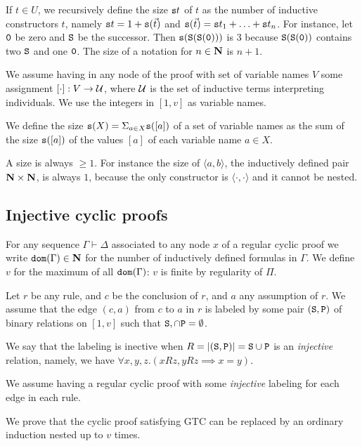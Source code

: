 \documentclass{lmcs}
\begin{document}
If $t \in U$, we recursively define the size ${\tt s}{t}$ of $t$ as the number of inductive 
constructors $t$, namely ${\tt s}{t} = 1 + {\tt s}(\vec{t})$ and 
${\tt s}(\vec{t}) = {\tt s}{t_1} + \ldots + {\tt s}{t_n}$. 
For instance, let $\tt 0$ be zero and $\tt S$ be the successor. 
Then $\tt {\tt s}(S(S(0)))$ is $3$
because $\tt S(S(0))$ contains two $\tt S$ and one $\tt 0$. 
The size of a notation for $n \in {\bf N}$ is $n+1$.

We assume having in any node of the proof with set of variable names $V$
some assignment $[\cdot]:V \rightarrow {\mathcal U}$, where ${\mathcal U}$ is the set of inductive
terms interpreting individuals. We use the integers in $[1,v]$ as variable names.

We define the size ${\tt s}(X) = \Sigma_{a \in X}{\tt s}([a]) $ 
of a set of variable names as the sum of the size ${\tt s}([a])$
of the values $[a]$ of each variable name $a \in X$. 

A size is always $\ge 1$. For instance the size of $\langle a, b \rangle$,
 the inductively defined pair ${\bf N} \times {\bf N}$,
is always $1$, because the only constructor is $\langle \cdot, \cdot \rangle$
and it cannot be nested.

\subsection{Injective cyclic proofs}
For any sequence $\Gamma \vdash \Delta$ associated to any node $x$ of a 
regular cyclic proof
we write ${\tt dom}(\Gamma) \in {\bf N}$ for the number of inductively defined formulas in $\Gamma$.
We define $v$ for the maximum of all ${\tt dom}(\Gamma)$: 
$v$ is finite by regularity of $\Pi$.

Let $r$ be any rule, and $c$ be the conclusion of $r$, and $a$ any assumption of
$r$. We assume that the edge $(c,a)$ from $c$ to $a$ in $r$ is labeled by some 
pair $({\tt S},{\tt P})$ of binary relations on $[1,v]$ such that ${\tt S}, \cap {\tt P} = \emptyset$.

We say that the labeling is inective when $R = {| ({\tt S},{\tt P}) |} =
{\tt S} \cup {\tt P}$ is an \emph{injective} relation, namely, 
we have $\forall x,y,z. (xRz, yRz \implies x=y)$.

We assume having a regular cyclic proof with some \emph{injective}
labeling for each edge in each rule. 

We prove that the cyclic proof satisfying GTC
can be replaced by an ordinary induction nested up to $v$ times.
\end{document}
